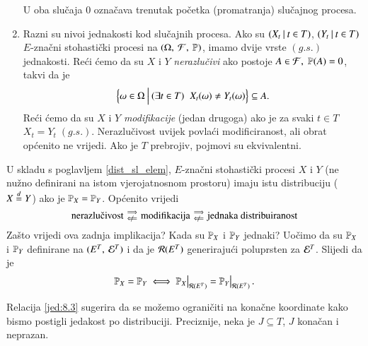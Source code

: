 \begin{nap}
\begin{enumerate}[label=(\alph*)]
\begin{itemize}
        \end{itemize}
        U oba slu\v caja $0$ ozna\v cava trenutak po\v cetka  (promatranja) slu\v cajnog procesa.
        \item Razni su nivoi jednakosti kod slu\v cajnih procesa.
        Ako su $({X_t} \: | \: {t \in T})$, $({Y_t} \: | \: {t \in T})$ $E$-zna\v cni stohasti\v cki procesi na $(\Omega, \: \mathcal{F}, \: \mathbb{P})$, imamo dvije vrste $(g.s.)$ jednakosti.
        Re\' ci \' cemo da su $X$ i $Y$ \emph{nerazlu\v civi} ako postoje $A \in \mathcal{F}, \; \mathbb{P}({A}) = 0$, takvi da je
        \begin{equation*}
            \Big\{ {\omega \in \Omega} \: \Big| \: {(\exists t \in T) \; \; X_t (\omega) \neq Y_t (\omega)} \Big\} \subseteq A.
        \end{equation*}
        Re\' ci \' cemo da su $X$ i $Y$ \emph{modifikacije} (jedan drugoga) ako je za svaki $t \in T$ $X_t = Y_t \; (g.s.)$.
        Nerazlu\v civost uvijek povla\' ci modificiranost, ali obrat op\' cenito ne vrijedi.
        Ako je $T$ prebrojiv, pojmovi su ekvivalentni.
    \end{enumerate}
\end{nap}

U skladu s poglavljem \ref{dist_sl_elem}, $E$-zna\v cni stohasti\v cki procesi $X$ i $Y$ (ne nu\v zno definirani na istom vjerojatnosnom prostoru) imaju istu distribuciju ($X \overset{d}{=} Y$) ako je $\mathbb{P}_X = \mathbb{P}_Y$.
Op\' cenito vrijedi
\begin{equation*}
    \textnormal{nerazlu\v civost}
    \begin{smallmatrix}
        \implies\\
        \notimpliedby
    \end{smallmatrix}
    \textnormal{modifikacija}
    \begin{smallmatrix}
        \implies\\
        \notimpliedby
    \end{smallmatrix}
    \textnormal{jednaka distribuiranost}
\end{equation*}
Za\v sto vrijedi ova zadnja implikacija?
Kada su $\mathbb{P}_X$ i $\mathbb{P}_Y$ jednaki?
Uo\v cimo da su $\mathbb{P}_X$ i $\mathbb{P}_Y$ definirane na $({E^T}, \: {\mathcal{E}^T})$ i da je $\mathcal{R}({E^T})$ generiraju\' ci poluprsten za $\mathcal{E}^T$.
Slijedi da je
\begin{equation}    \label{jed:8.3}
    \masP_X = \masP_Y
    \iff
    \restr{\masP_X}{\prsten{E^T}} = \restr{\masP_Y}{\prsten{E^T}}.
\end{equation}

Relacija \eqref{jed:8.3} sugerira da se mo\v zemo ograni\v citi na kona\v cne koordinate kako bismo postigli jedakost po distribuciji.
Preciznije, neka je $J \subseteq T$, $J$ kona\v can i neprazan.

